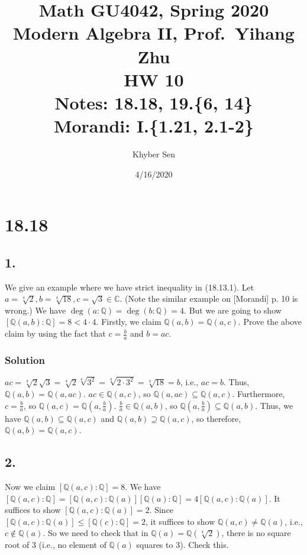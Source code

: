 \documentclass[fleqn]{article}
\title{
Math GU4042, Spring 2020 \\
Modern Algebra II, Prof.\ Yihang Zhu \\
HW 10 \\
Notes: 18.18, 19.\{6, 14\} \\
Morandi: I.\{1.21, 2.1-2\} \\
}
\author{Khyber Sen}
\date{4/16/2020}
\begin{document}
    
    \maketitle
    
    \section{18.18}
        
        \subsection{1.}
        We give an example where we have strict inequality in (18.13.1).  Let $a = \sqrt[4]{2}, b = \sqrt[4]{18}, c = \sqrt{3} \in \mathbb{C}$.  (Note the similar example on [Morandi] p. 10 is wrong.)  We have $\deg(a : \mathbb{Q}) = \deg(b : \mathbb{Q}) = 4$.  But we are going to show $[\mathbb{Q}(a, b) : \mathbb{Q}] = 8 < 4 \cdot 4$.  Firstly, we claim $\mathbb{Q}(a, b) = \mathbb{Q}(a, c)$.  Prove the above claim by using the fact that $c = \frac{b}{a}$ and $b = ac$.
            
            \subsubsection{Solution}
            $ac = \sqrt[4]{2} \sqrt{3} = \sqrt[4]{2} \sqrt[4]{3^2} = \sqrt[4]{2 \cdot 3^2} = \sqrt[4]{18} = b$, i.e., $ac = b$.  Thus, $\mathbb{Q}(a, b) = \mathbb{Q}(a, ac)$.  $ac \in \mathbb{Q}(a, c)$, so $\mathbb{Q}(a, ac) \subseteq \mathbb{Q}(a, c)$.  Furthermore, $c = \frac{b}{a}$, so $\mathbb{Q}(a, c) = \mathbb{Q}\left(a, \frac{b}{a}\right)$.  $\frac{b}{a} \in \mathbb{Q}(a, b)$, so $\mathbb{Q}\left(a, \frac{b}{a}\right) \subseteq \mathbb{Q}(a, b)$.  Thus, we have $\mathbb{Q}(a, b) \subseteq \mathbb{Q}(a, c)$ and $\mathbb{Q}(a, b) \supseteq \mathbb{Q}(a, c)$, so therefore, $\mathbb{Q}(a, b) = \mathbb{Q}(a, c)$.
        
        \subsection{2.}
        Now we claim $[\mathbb{Q}(a, c) : \mathbb{Q}] = 8$.  We have $[\mathbb{Q}(a, c) : \mathbb{Q}] = [\mathbb{Q}(a, c) : \mathbb{Q}(a)] [\mathbb{Q}(a) : \mathbb{Q}] = 4 [\mathbb{Q}(a, c) : \mathbb{Q}(a)]$.  It suffices to show $[\mathbb{Q}(a, c) : \mathbb{Q}(a)] = 2$.  Since $[\mathbb{Q}(a, c) : \mathbb{Q}(a)] \leq [\mathbb{Q}(c) : \mathbb{Q}] = 2$, it suffices to show $\mathbb{Q}(a, c) \neq \mathbb{Q}(a)$, i.e., $c \notin \mathbb{Q}(a)$.  So we need to check that in $\mathbb{Q}(a) = \mathbb{Q}\left(\sqrt[4]{2}\right)$, there is no square root of 3 (i.e., no element of $\mathbb{Q}(a)$ squares to 3).  Check this.
            
\end{document}
